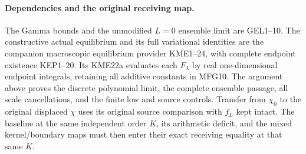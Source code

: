 \paragraph{Dependencies and the original receiving map.}
The Gamma bounds and the unmodified $L=0$ ensemble limit are GEL1--10.
The constructive actual equilibrium and its full variational identities
are the companion macroscopic equilibrium provider KME1--24, with
complete endpoint existence KEP1--20. Its KME22a evaluates each
$F_\lambda$ by real one-dimensional endpoint integrals, retaining all
additive constants in MFG10. The argument above proves the discrete polynomial
limit, the complete ensemble passage, all scale cancellations, and the
finite low and source controls. Transfer from $\chi_0$ to the original
displaced $\chi$ uses its original source comparison with $f_L$ kept
intact. The baseline at the same independent order $K$, its arithmetic
deficit, and the mixed kernel/boundary maps must then enter their exact
receiving equality at that same $K$.

